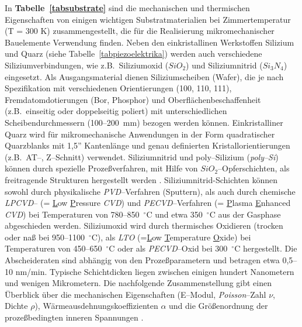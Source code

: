 In {\bf Tabelle~\ref{tabsubstrate}} sind die mechanischen und
thermischen Eigenschaften von einigen wichtigen Substratmaterialien
bei Zimmertemperatur (T = 300 K) zusammengestellt, die für die
Realisierung mikromechanischer Bauelemente Verwendung finden.  Neben den
einkristallinen Werkstoffen Silizium und Quarz (siehe
Tabelle~\ref{tabpiezoelektrika})
werden auch verschiedene Siliziumverbindungen, wie z.B.\ Siliziumoxid
($ SiO_{2} $) und Siliziumnitrid ($ Si_{3}N_{4} $) eingesetzt.  Als
Ausgangsmaterial
dienen Siliziumscheiben (Wafer), die je nach Spezifikation mit
verschiedenen Orientierungen (100, 110, 111), Fremdatomdotierungen (Bor,
Phosphor) und Oberflächenbeschaffenheit (z.B.\ einseitig oder doppelseitig
poliert) mit unterschiedlichen Scheibendurchmessern (100--200~mm) bezogen
werden können. Einkristalliner Quarz wird für mikromechanische
Anwendungen in der Form quadratischer Quarzblanks mit 1,5'' Kantenlänge und
genau definierten Kristallorientierungen (z.B.\ AT--, Z--Schnitt) verwendet.
Siliziumnitrid und poly--Silizium ({\em poly--Si}) können durch spezielle
Prozeßverfahren, mit Hilfe von $SiO_{2}$--Opferschichten,
als freitragende Strukturen hergestellt werden \cite{Kam90}.
Siliziumnitrid-Schichten können sowohl durch physikalische
{\em PVD}--Verfahren
(Sputtern), als auch durch chemische {\em LPCVD}-- (= \underline{L}ow
\underline{P}ressure {\sl CVD}) und {\em PECVD}--Verfahren
(= \underline{P}lasma \underline{E}nhanced {\em CVD}) bei Temperaturen
von 780--850~$^\circ$C und etwa 350~$^\circ$C aus der Gasphase
abgeschieden werden. Siliziumoxid wird durch thermisches Oxidieren
(trocken oder naß bei 950--1100~$^\circ$C), als {\em LTO}
(=\underline{L}ow \underline{T}emperature \underline{O}xide) bei
Temperaturen von 450--650~$^\circ$C oder als {\em PECVD}--Oxid bei
300~$^\circ$C hergestellt. Die Abscheideraten sind abhängig von
den Prozeßparametern und betragen etwa 0,5--10 nm/min. Typische
Schichtdicken liegen zwischen einigen hundert Nanometern und wenigen
Mikrometern. Die nachfolgende Zusammenstellung gibt einen Überblick über
die mechanischen Eigenschaften (E--Modul, {\sl Poisson}--Zahl $\nu$,
Dichte $\rho$), Wärmeausdehnungskoeffizienten $\alpha$ und die Größenordnung
der prozeßbedingten inneren Spannungen
\cite{Bach, Bue91a, Heu89, Kam90, Pet79, Tab89, Wandt}.
